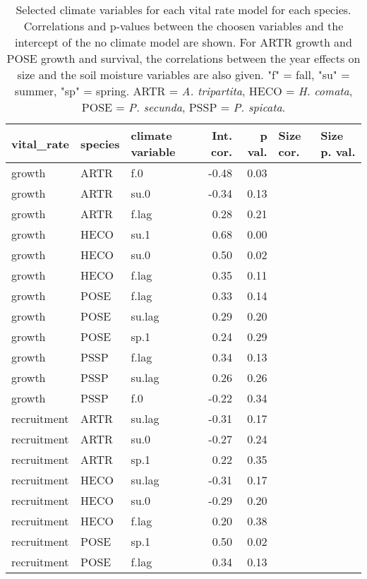 \begin{table}[ht]
\centering
\caption{Selected climate variables for each vital rate model for each species. Correlations and p-values between the choosen variables and the intercept of the no climate model are shown. For ARTR growth and POSE growth and survival, the correlations between the year effects on size and the soil moisture variables are also given. "f" = fall, "su" = summer, "sp" = spring. ARTR = \textit{A. tripartita}, HECO = \textit{H. comata}, POSE = \textit{P. secunda}, PSSP = \textit{P. spicata}.} 
\label{table:strongCor}
\begin{tabular}{lllrrll}
  \hline
vital\_rate & species & climate variable & Int. cor. & p val. & Size cor. & Size p. val. \\ 
  \hline
growth & ARTR & f.0 & -0.48 & 0.03 &  &  \\ 
  growth & ARTR & su.0 & -0.34 & 0.13 &  &  \\ 
  growth & ARTR & f.lag & 0.28 & 0.21 &  &  \\ 
  growth & HECO & su.1 & 0.68 & 0.00 &  &  \\ 
  growth & HECO & su.0 & 0.50 & 0.02 &  &  \\ 
  growth & HECO & f.lag & 0.35 & 0.11 &  &  \\ 
  growth & POSE & f.lag & 0.33 & 0.14 &  &  \\ 
  growth & POSE & su.lag & 0.29 & 0.20 &  &  \\ 
  growth & POSE & sp.1 & 0.24 & 0.29 &  &  \\ 
  growth & PSSP & f.lag & 0.34 & 0.13 &  &  \\ 
  growth & PSSP & su.lag & 0.26 & 0.26 &  &  \\ 
  growth & PSSP & f.0 & -0.22 & 0.34 &  &  \\ 
  recruitment & ARTR & su.lag & -0.31 & 0.17 &  &  \\ 
  recruitment & ARTR & su.0 & -0.27 & 0.24 &  &  \\ 
  recruitment & ARTR & sp.1 & 0.22 & 0.35 &  &  \\ 
  recruitment & HECO & su.lag & -0.31 & 0.17 &  &  \\ 
  recruitment & HECO & su.0 & -0.29 & 0.20 &  &  \\ 
  recruitment & HECO & f.lag & 0.20 & 0.38 &  &  \\ 
  recruitment & POSE & sp.1 & 0.50 & 0.02 &  &  \\ 
  recruitment & POSE & f.lag & 0.34 & 0.13 &  &  \\ 

\end{tabular}
\end{table}
